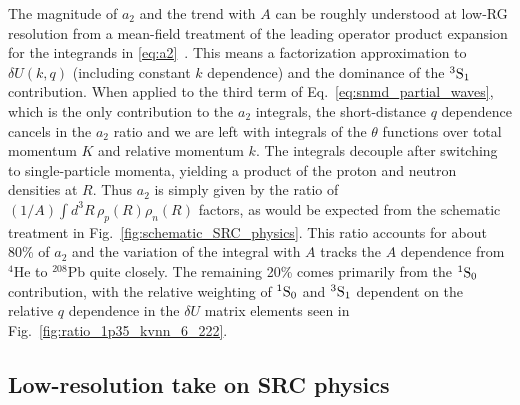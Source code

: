 \documentclass[10pt,aps,prc,floatfix,twocolumn,nofootinbib]{revtex4-1}
\begin{document}
The magnitude of $a_2$ and the trend with $A$ can be roughly understood at low-RG resolution from a mean-field treatment of the leading operator product expansion for the integrands in \eqref{eq:a2}~\cite{Anderson:2010aq,Chen:2016bde,Lynn:2019vwp}. This means a factorization approximation to $\delta U(k,q)$ (including constant $k$ dependence) and the dominance of the $^3\mbox{S}_1$ contribution.
When applied to the third term of Eq.~\eqref{eq:snmd_partial_waves}, which is the only contribution to the $a_2$ integrals,
the short-distance $q$ dependence cancels in the $a_2$ ratio and we are left with integrals of the $\theta$ functions over total momentum $K$ and relative momentum $k$. 
The integrals decouple after switching to single-particle momenta,  yielding a product of the proton and neutron densities at $R$. Thus $a_2$ is simply given by the ratio of $(1/A)\int d^3R\, \rho_p(R)\rho_n(R)$ factors, as would be expected from the schematic treatment in Fig.~\ref{fig:schematic_SRC_physics}. 
This ratio accounts for about 80\% of $a_2$ and the variation of the integral with $A$ tracks the $A$ dependence from $^4$He to $^{208}$Pb quite closely.
The remaining 20\% comes primarily from the $^1\mbox{S}_0$ contribution, with the relative weighting of $^1\mbox{S}_0$ and $^3\mbox{S}_1$ dependent on the relative $q$ dependence in the $\delta U$ matrix elements seen in Fig.~\ref{fig:ratio_1p35_kvnn_6_222}.




\subsection{Low-resolution take on SRC physics}
\end{document}
